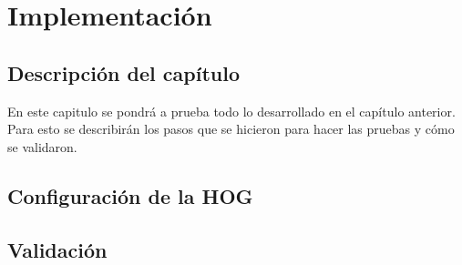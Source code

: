 \chapter{Implementación}
\thispagestyle{empty}

\section{Descripción del capítulo} \label{sec:\thesection}
En este capitulo se pondrá a prueba todo lo desarrollado en el capítulo anterior. Para esto se describirán los pasos que se hicieron para hacer las pruebas y cómo se validaron.

\section{Configuración de la HOG} \label{sec:\thesection}

\section{Validación} \label{sec:\thesection}


